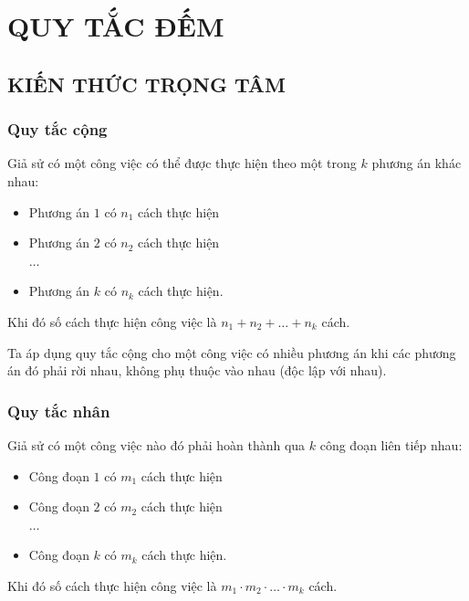 
\setcounter{chapter}{7}
\setcounter{section}{22}
\section{QUY TẮC ĐẾM}
\subsection{KIẾN THỨC TRỌNG TÂM}
\subsubsection{Quy tắc cộng}
\begin{dn}
	\noindent Giả sử có một công việc có thể được thực hiện theo một trong $k$ phương án khác nhau:
\begin{itemize}
\item Phương án $1$ có $n_1$ cách thực hiện
 \item Phương án $2$ có $n_2$ cách thực hiện\\
 $\ldots$
  \item Phương án $k$ có $n_k$ cách thực hiện.
\end{itemize}
Khi đó số cách thực hiện công việc là $n_1 + n_2 +\ldots+n_k$ cách.
\end{dn}
\begin{note}
Ta áp dụng quy tắc cộng cho một công việc có nhiều phương án khi các phương án đó phải rời nhau, không phụ thuộc vào nhau (độc lập với nhau).
\end{note}
\subsubsection{Quy tắc nhân}
\begin{dn}
	\noindent Giả sử có một công việc nào đó phải hoàn thành qua $k$ công đoạn liên tiếp nhau: \begin{itemize}
	\item Công đoạn $1$ có $m_1$ cách thực hiện
	\item Công đoạn $2$ có $m_2$ cách thực hiện\\
	$\ldots$
	\item Công đoạn $k$ có $m_k$ cách thực hiện.
\end{itemize}
Khi đó số cách thực hiện công việc là $m_1\cdot m_2\cdot \ldots \cdot m_k$ cách.
\end{dn}

